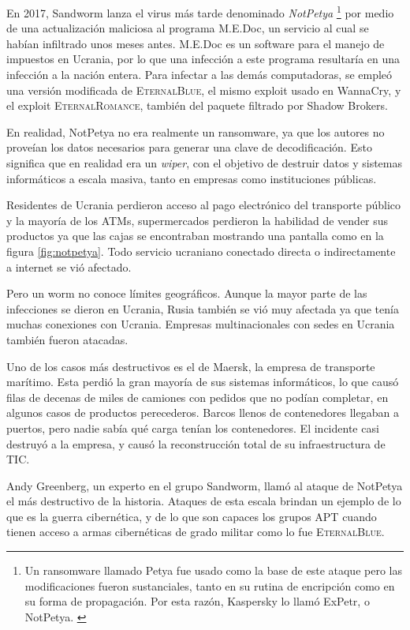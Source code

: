\documentclass{article}
\begin{document}
En 2017, Sandworm lanza el virus más tarde denominado {\it NotPetya} \footnote{Un ransomware llamado Petya fue usado como la base de este ataque pero las modificaciones fueron sustanciales, tanto en su rutina de encripción como en su forma de propagación. Por esta razón, Kaspersky lo llamó ExPetr, o NotPetya. \autocite{kaspersky-notpetya}} por medio de una actualización maliciosa al programa M.E.Doc, un servicio al cual se habían infiltrado unos meses antes. M.E.Doc es un software para el manejo de impuestos en Ucrania, por lo que una infección a este programa resultaría en una infección a la nación entera. Para infectar a las demás computadoras, se empleó una versión modificada de \textsc{EternalBlue}, el mismo exploit usado en WannaCry, y el exploit \textsc{EternalRomance}, también del paquete filtrado por Shadow Brokers.

En realidad, NotPetya no era realmente un ransomware, ya que los autores no proveían los datos necesarios para generar una clave de decodificación. Esto significa que en realidad era un {\it wiper}, con el objetivo de destruir datos y sistemas informáticos a escala masiva, tanto en empresas como instituciones públicas.

Residentes de Ucrania perdieron acceso al pago electrónico del transporte público y la mayoría de los ATMs, supermercados perdieron la habilidad de vender sus productos ya que las cajas se encontraban mostrando una pantalla como en la figura \ref{fig:notpetya}. Todo servicio ucraniano conectado directa o indirectamente a internet se vió afectado.

Pero un worm no conoce límites geográficos. Aunque la mayor parte de las infecciones se dieron en Ucrania, Rusia también se vió muy afectada ya que tenía muchas conexiones con Ucrania. Empresas multinacionales con sedes en Ucrania también fueron atacadas. \autocite{securelist-notpetya}

Uno de los casos más destructivos es el de Maersk, la empresa de transporte marítimo. Esta perdió la gran mayoría de sus sistemas informáticos, lo que causó filas de decenas de miles de camiones con pedidos que no podían completar, en algunos casos de productos perecederos. Barcos llenos de contenedores llegaban a puertos, pero nadie sabía qué carga tenían los contenedores. El incidente casi destruyó a la empresa, y causó la reconstrucción total de su infraestructura de TIC. \autocite{darknetdiaries-notpetya}

Andy Greenberg, un experto en el grupo Sandworm, llamó al ataque de NotPetya el más destructivo de la historia. Ataques de esta escala brindan un ejemplo de lo que es la guerra cibernética, y de lo que son capaces los grupos APT cuando tienen acceso a armas cibernéticas de grado militar como lo fue \textsc{EternalBlue}. \autocite{wired-notpetya} \autocite{greenberg-sandworm} 
\end{document}

